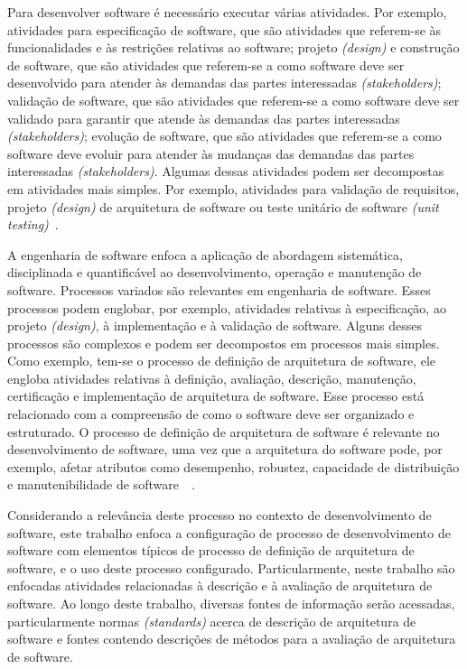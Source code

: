 Para desenvolver software é necessário executar várias atividades. Por exemplo, atividades para especificação de software, que são atividades que referem-se às funcionalidades e às restrições relativas ao software; projeto \emph{(design)} e construção de software, que são atividades que referem-se a como software deve ser desenvolvido para atender às demandas das partes interessadas \emph{(stakeholders)}; validação de software, que são atividades que referem-se a como software deve ser validado para garantir que atende às demandas das partes interessadas \emph{(stakeholders)}; evolução de software, que são atividades que referem-se a como software deve evoluir para atender às mudanças das demandas das partes interessadas \emph{ (stakeholders)}. Algumas dessas atividades podem ser decompostas em atividades mais simples. Por exemplo, atividades para validação de requisitos,  projeto \emph{(design)} de arquitetura de software ou teste unitário de software \emph{(unit testing)}~\cite{Sommerville_2011_texbook}.

A engenharia de software enfoca a aplicação de abordagem sistemática, disciplinada e quantificável ao desenvolvimento, operação e manutenção de software. Processos variados são relevantes em engenharia de software. Esses processos podem englobar, por exemplo, atividades relativas à especificação, ao projeto \emph{(design)}, à implementação e à validação de software. Alguns desses processos são complexos e podem ser decompostos em processos mais simples. Como exemplo, tem-se o processo de definição de arquitetura de software, ele engloba atividades relativas à definição, avaliação, descrição, manutenção, certificação e implementação de arquitetura de software. Esse processo está relacionado com a compreensão de como o software deve ser organizado e estruturado. O processo de definição de arquitetura de software é relevante no desenvolvimento de software, uma vez que a arquitetura do software pode, por exemplo, afetar atributos como desempenho, robustez, capacidade de distribuição e manutenibilidade de software~\cite{Sommerville_2011_texbook}~\cite{Swebok}. 

Considerando a relevância deste processo no contexto de desenvolvimento de software, este trabalho enfoca a configuração de processo de desenvolvimento de software com elementos típicos de processo de definição de arquitetura de software, e o uso deste processo configurado. Particularmente, neste trabalho são enfocadas atividades relacionadas à descrição e à avaliação de arquitetura de software. Ao longo deste trabalho, diversas fontes de informação serão acessadas, particularmente normas \emph{(standards)}  acerca de descrição de arquitetura de software e fontes contendo descrições de métodos para a avaliação de arquitetura de software.


